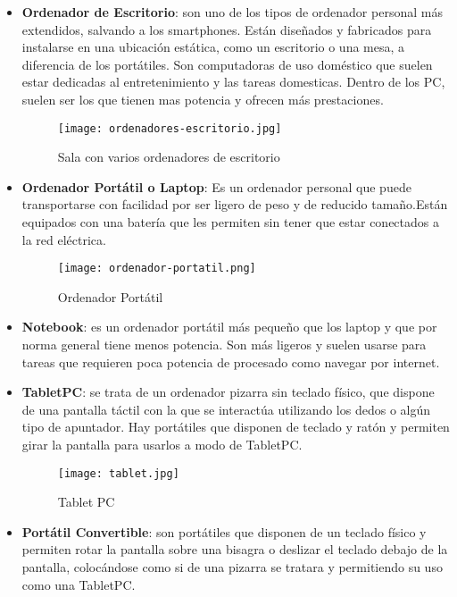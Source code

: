 \begin{itemize}
    \item \textbf{Ordenador de Escritorio}: son uno de los tipos de ordenador personal más extendidos, salvando a los smartphones. Están diseñados y fabricados para instalarse en una ubicación estática, como un escritorio o una mesa, a diferencia de los portátiles. Son computadoras de uso doméstico que suelen estar dedicadas al entretenimiento y las tareas domesticas. Dentro de los PC, suelen ser los que tienen mas potencia y ofrecen más prestaciones.

    \begin{figure}[ht]
        \centering
        \texttt{[image: ordenadores-escritorio.jpg]}
        \caption{Sala con varios ordenadores de escritorio}
    \end{figure}

    \item \textbf{Ordenador Portátil o Laptop}: Es un ordenador personal que puede transportarse con facilidad por ser ligero de peso y de reducido tamaño.Están equipados con una batería que les permiten sin tener que estar conectados a la red eléctrica.

    \begin{figure}[ht]
        \centering
        \texttt{[image: ordenador-portatil.png]}
        \caption{Ordenador Portátil}
    \end{figure}

    \item \textbf{Notebook}: es un ordenador portátil más pequeño que los laptop y que por norma general tiene menos potencia. Son más ligeros y suelen usarse para tareas que requieren poca potencia de procesado como navegar por internet.

    \item \textbf{TabletPC}: se trata de un ordenador pizarra sin teclado físico, que dispone de una pantalla táctil con la que se interactúa utilizando los dedos o algún tipo de apuntador. Hay portátiles que disponen de teclado y ratón y permiten girar la pantalla para usarlos a modo de TabletPC.

    \begin{figure}[ht]
        \centering
        \texttt{[image: tablet.jpg]}
        \caption{Tablet PC}
    \end{figure}

    \item \textbf{Portátil Convertible}: son portátiles que disponen de un teclado físico y permiten rotar la pantalla sobre una bisagra o deslizar el teclado debajo de la pantalla, colocándose como si de una pizarra se tratara y permitiendo su uso como una TabletPC.


\end{itemize}
